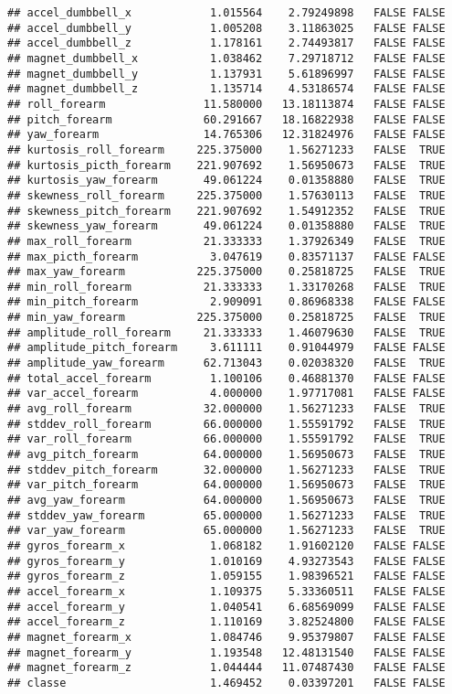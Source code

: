 \documentclass[]{article}
\begin{document}
\begin{verbatim}
## accel_dumbbell_x            1.015564    2.79249898   FALSE FALSE
## accel_dumbbell_y            1.005208    3.11863025   FALSE FALSE
## accel_dumbbell_z            1.178161    2.74493817   FALSE FALSE
## magnet_dumbbell_x           1.038462    7.29718712   FALSE FALSE
## magnet_dumbbell_y           1.137931    5.61896997   FALSE FALSE
## magnet_dumbbell_z           1.135714    4.53186574   FALSE FALSE
## roll_forearm               11.580000   13.18113874   FALSE FALSE
## pitch_forearm              60.291667   18.16822938   FALSE FALSE
## yaw_forearm                14.765306   12.31824976   FALSE FALSE
## kurtosis_roll_forearm     225.375000    1.56271233   FALSE  TRUE
## kurtosis_picth_forearm    221.907692    1.56950673   FALSE  TRUE
## kurtosis_yaw_forearm       49.061224    0.01358880   FALSE  TRUE
## skewness_roll_forearm     225.375000    1.57630113   FALSE  TRUE
## skewness_pitch_forearm    221.907692    1.54912352   FALSE  TRUE
## skewness_yaw_forearm       49.061224    0.01358880   FALSE  TRUE
## max_roll_forearm           21.333333    1.37926349   FALSE  TRUE
## max_picth_forearm           3.047619    0.83571137   FALSE FALSE
## max_yaw_forearm           225.375000    0.25818725   FALSE  TRUE
## min_roll_forearm           21.333333    1.33170268   FALSE  TRUE
## min_pitch_forearm           2.909091    0.86968338   FALSE FALSE
## min_yaw_forearm           225.375000    0.25818725   FALSE  TRUE
## amplitude_roll_forearm     21.333333    1.46079630   FALSE  TRUE
## amplitude_pitch_forearm     3.611111    0.91044979   FALSE FALSE
## amplitude_yaw_forearm      62.713043    0.02038320   FALSE  TRUE
## total_accel_forearm         1.100106    0.46881370   FALSE FALSE
## var_accel_forearm           4.000000    1.97717081   FALSE FALSE
## avg_roll_forearm           32.000000    1.56271233   FALSE  TRUE
## stddev_roll_forearm        66.000000    1.55591792   FALSE  TRUE
## var_roll_forearm           66.000000    1.55591792   FALSE  TRUE
## avg_pitch_forearm          64.000000    1.56950673   FALSE  TRUE
## stddev_pitch_forearm       32.000000    1.56271233   FALSE  TRUE
## var_pitch_forearm          64.000000    1.56950673   FALSE  TRUE
## avg_yaw_forearm            64.000000    1.56950673   FALSE  TRUE
## stddev_yaw_forearm         65.000000    1.56271233   FALSE  TRUE
## var_yaw_forearm            65.000000    1.56271233   FALSE  TRUE
## gyros_forearm_x             1.068182    1.91602120   FALSE FALSE
## gyros_forearm_y             1.010169    4.93273543   FALSE FALSE
## gyros_forearm_z             1.059155    1.98396521   FALSE FALSE
## accel_forearm_x             1.109375    5.33360511   FALSE FALSE
## accel_forearm_y             1.040541    6.68569099   FALSE FALSE
## accel_forearm_z             1.110169    3.82524800   FALSE FALSE
## magnet_forearm_x            1.084746    9.95379807   FALSE FALSE
## magnet_forearm_y            1.193548   12.48131540   FALSE FALSE
## magnet_forearm_z            1.044444   11.07487430   FALSE FALSE
## classe                      1.469452    0.03397201   FALSE FALSE
\end{verbatim}
\end{document}
